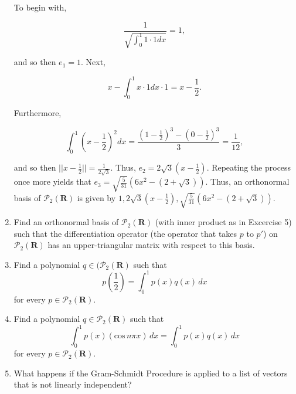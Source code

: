 \documentclass{book}
\begin{document}
\begin{enumerate}
To begin with,

\begin{equation*}
    \frac{1}{\sqrt{\int_0^1 1 \cdot 1 dx}} = 1,
\end{equation*}

and so then \(e_1 = 1\).  Next, 

\begin{equation*}
    x - \int_0^1 x \cdot 1 dx \cdot 1 = x - \frac{1}{2}.
\end{equation*}

Furthermore,

\begin{equation*}
    \int_0^1 (x - \frac{1}{2})^2 dx = \frac{(1 - \frac{1}{2})^3 - (0 - \frac{1}{2})^3}{3} = \frac{1}{12},
\end{equation*}

and so then \(||x - \frac{1}{2}|| = \frac{1}{2 \sqrt{3}}\).  Thus, \(e_2 = 2 \sqrt{3} (x - \frac{1}{2})\).  Repeating the process once more yields that \(e_3 = \sqrt{\frac{5}{31}} (6x^2 - (2 + \sqrt{3}))\).  Thus, an orthonormal basis of \(\mathcal{P}_2(\textbf{R})\) is given by \(1, 2 \sqrt{3} (x - \frac{1}{2}), \sqrt{\frac{5}{31}} (6x^2 - (2 + \sqrt{3}))\).

\item Find an orthonormal basis of \(\mathcal{P}_2(\textbf{R})\) (with inner product as in Excercise 5) such that the differentiation operator (the operator that takes \(p\) to \(p'\)) on \(\mathcal{P}_2(\textbf{R})\) has an upper-triangular matrix with respect to this basis.

\item Find a polynomial \(q \in (\mathcal{P}_2(\textbf{R})\) such that \[p(\frac{1}{2})= \int_{0}^{1} p(x)q(x) \, dx\] for every \(p \in \mathcal{P}_2(\textbf{R})\).

\item  Find a polynomial \(q \in \mathcal{P}_2(\textbf{R})\) such that \[\int_{0}^{1} p(x)(\textrm{cos} \, n\pi x) \, dx= \int_{0}^{1} p(x)q(x) \, dx\] for every \(p \in \mathcal{P}_2(\textbf{R})\).

\item What happens if the Gram-Schmidt Procedure is applied to a list of vectors that is not linearly independent?


\end{enumerate}
\end{document}

